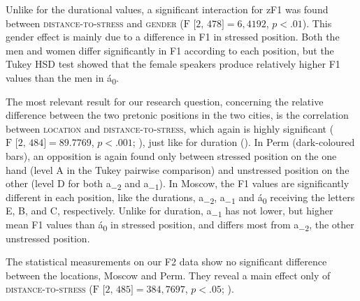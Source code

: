 \documentclass[output=paper,colorlinks,citecolor=black]{langscibook}
\begin{document}
Unlike for the durational values, a significant interaction for zF1 was found between \textsc{distance-to-stress} and \textsc{gender} ($\text{F [2, 478]} = 6,4192$, $p < .01$). This gender effect is mainly due to a difference in F1 in stressed position. Both the men and women differ significantly in F1 according to each position, but the Tukey HSD test showed that the female speakers produce relatively higher F1 values than the men in á\textsubscript{\tiny{$0$}}.

The most relevant result for our research question, concerning the relative difference between the two pretonic positions in the two cities, is the correlation between \textsc{location} and \textsc{distance-to-stress,} which again is highly significant ($\text{F [2, 484]} = 89.7769$, $p < .001$; ), just like for duration (). In Perm (dark-coloured bars), an opposition is again found only between stressed position on the one hand (level A in the Tukey pairwise comparison) and unstressed position on the other (level D for both a\textsubscript{\tiny{$-2$}} and a\textsubscript{\tiny{$-1$}}). In Moscow, the F1 values are significantly different in each position, like the durations, a\textsubscript{\tiny{$-2$}}, a\textsubscript{\tiny{$-1$}} and á\textsubscript{\tiny{$0$}} receiving the letters E, B, and C, respectively. Unlike for duration, a\textsubscript{\tiny{$-1$}} has not lower, but higher mean F1 values than á\textsubscript{\tiny{$0$}} in stressed position, and differs most from a\textsubscript{\tiny{$-2$}}, the other unstressed position.


The statistical measurements on our F2 data show no significant difference between the locations, Moscow and Perm. They reveal a main effect only of \textsc{distance-to-stress} ($\text{F [2, 485]} = 384,7697$, $p < .05$; ).

\tFTwo
\end{document}
